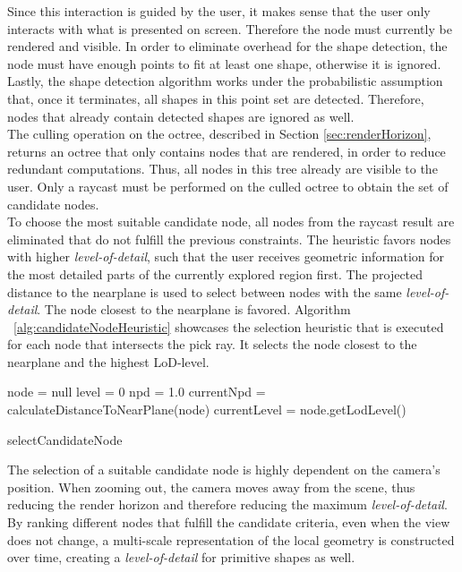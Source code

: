 Since this interaction is guided by the user, it makes sense that the user only interacts with what is presented on screen. Therefore the node must currently be rendered and visible. In order to eliminate overhead for the shape detection, the node must have enough points to fit at least one shape, otherwise it is ignored. Lastly, the shape detection algorithm works under the probabilistic assumption that, once it terminates, all shapes in this point set are detected. Therefore, nodes that already contain detected shapes are ignored as well. 
\\
The culling operation on the octree, described in Section \ref{sec:renderHorizon}, returns an octree that only contains nodes that are rendered, in order to reduce redundant computations. Thus, all nodes in this tree already are visible to the user. Only a raycast must be performed on the culled octree to obtain the set of candidate nodes. 
\\
To choose the most suitable candidate node, all nodes from the raycast result are eliminated that do not fulfill the previous constraints. The heuristic favors nodes with higher \textit{level-of-detail}, such that the user receives geometric information for the most detailed parts of the currently explored region first. The projected distance to the nearplane is used to select between nodes with the same \textit{level-of-detail}. The node closest to the nearplane is favored. Algorithm ~\ref{alg:candidateNodeHeuristic} showcases the selection heuristic that is executed for each node that intersects the pick ray. It selects the node closest to the nearplane and the highest LoD-level.

\begin{algorithm}
	
	node 	= null\;
	level = 0\;
	npd 	= 1.0\;
	{			
		currentNpd = calculateDistanceToNearPlane(node)	\;
		currentLevel = node.getLodLevel()\;
	}
\caption{selectCandidateNode}
\label{alg:candidateNodeHeuristic}
\end{algorithm}

The selection of a suitable candidate node is highly dependent on the camera's position. When zooming out, the camera moves away from the scene, thus reducing the render horizon and therefore reducing the maximum \textit{level-of-detail}. By ranking different nodes that fulfill the candidate criteria, even when the view does not change, a multi-scale representation of the local geometry is constructed over time, creating a \textit{level-of-detail} for primitive shapes as well. 


